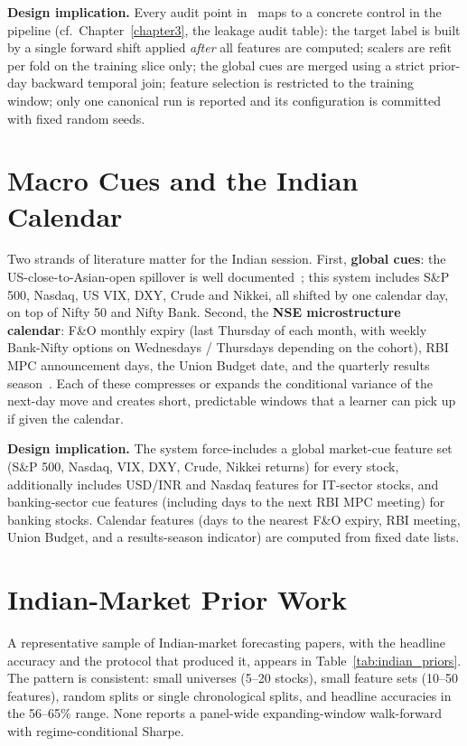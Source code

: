 \textbf{Design implication.} Every audit point in~\cite{prado2018walkforward} maps to a concrete control in the pipeline (cf.\ Chapter~\ref{chapter3}, the leakage audit table): the target label is built by a single forward shift applied \emph{after} all features are computed; scalers are refit per fold on the training slice only; the global cues are merged using a strict prior-day backward temporal join; feature selection is restricted to the training window; only one canonical run is reported and its configuration is committed with fixed random seeds.

\section{Macro Cues and the Indian Calendar}

Two strands of literature matter for the Indian session. First, \textbf{global cues}: the US-close-to-Asian-open spillover is well documented~\cite{eun1989international,rapach2013}; this system includes S\&P 500, Nasdaq, US VIX, DXY, Crude and Nikkei, all shifted by one calendar day, on top of Nifty 50 and Nifty Bank. Second, the \textbf{NSE microstructure calendar}: F\&O monthly expiry (last Thursday of each month, with weekly Bank-Nifty options on Wednesdays / Thursdays depending on the cohort), RBI MPC announcement days, the Union Budget date, and the quarterly results season~\cite{nse_handbook}. Each of these compresses or expands the conditional variance of the next-day move and creates short, predictable windows that a learner can pick up if given the calendar.

\textbf{Design implication.} The system force-includes a global market-cue feature set (S\&P 500, Nasdaq, VIX, DXY, Crude, Nikkei returns) for every stock, additionally includes USD/INR and Nasdaq features for IT-sector stocks, and banking-sector cue features (including days to the next RBI MPC meeting) for banking stocks. Calendar features (days to the nearest F\&O expiry, RBI meeting, Union Budget, and a results-season indicator) are computed from fixed date lists.

\section{Indian-Market Prior Work}

A representative sample of Indian-market forecasting papers, with the headline accuracy and the protocol that produced it, appears in Table~\ref{tab:indian_priors}. The pattern is consistent: small universes (5--20 stocks), small feature sets (10--50 features), random splits or single chronological splits, and headline accuracies in the 56--65\% range. None reports a panel-wide expanding-window walk-forward with regime-conditional Sharpe.

